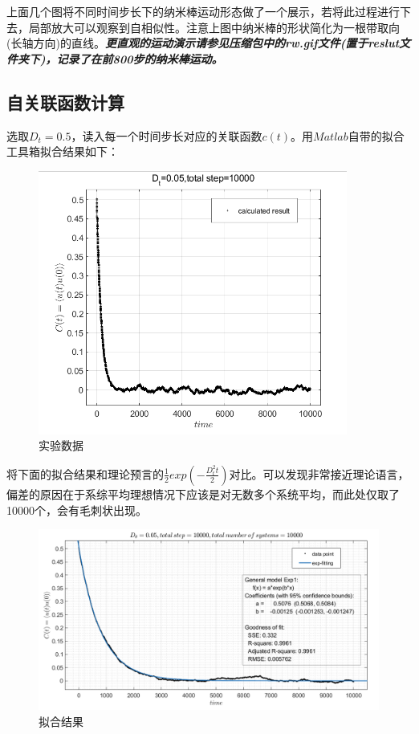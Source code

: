 \documentclass[UTF8]{ctexart}
\begin{document}
	\begin{flushleft}
		上面几个图将不同时间步长下的纳米棒运动形态做了一个展示，若将此过程进行下去，局部放大可以观察到自相似性。注意上图中纳米棒的形状简化为一根带取向(长轴方向)的直线。\textbf{\textit{更直观的运动演示请参见压缩包中的rw.gif文件(置于reslut文件夹下)，记录了在前800步的纳米棒运动。}}
	\end{flushleft}
	
	\subsection{自关联函数计算}
	
	选取$D_t=0.5$，读入每一个时间步长对应的关联函数$c(t)$。用$Matlab$自带的拟合工具箱拟合结果如下：
	
	\begin{figure}[H]
		\centering  %
		\includegraphics[width=4in]{3}
		\caption{实验数据}
	\end{figure}
	
\begin{flushleft}
		
	将下面的拟合结果和理论预言的$\frac{1}{2}exp(-\frac{D_t^2t}{2})$对比。可以发现非常接近理论语言，偏差的原因在于系综平均理想情况下应该是对无数多个系统平均，而此处仅取了10000个，会有毛刺状出现。
\end{flushleft}
	\begin{figure}[H]
		\centering  %
		\includegraphics[width=6in]{rw}
		\caption{拟合结果}
	\end{figure}
	
\end{document}
